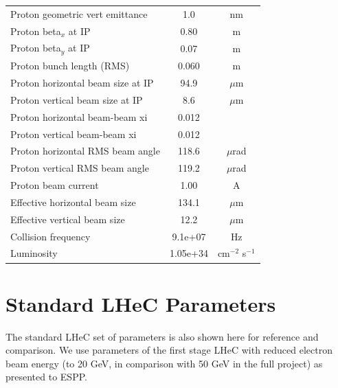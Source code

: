 \documentclass{article}
\begin{document}
\begin{longtable}{lcc}
Proton geometric vert emittance & 1.0 & nm \\
Proton beta$_x$ at IP & 0.80 & m \\
Proton beta$_y$ at IP & 0.07 & m \\
Proton bunch length (RMS) & 0.060 & m \\
Proton horizontal beam size at IP & 94.9 & $\mu$m \\
Proton vertical beam size at IP & 8.6 & $\mu$m \\
Proton horizontal beam-beam xi & 0.012 &  \\
Proton vertical beam-beam xi & 0.012 &  \\
Proton horizontal RMS beam angle & 118.6 & $\mu$rad \\
Proton vertical RMS beam angle & 119.2 & $\mu$rad \\
Proton beam current & 1.00 & A \\
Effective horizontal beam size & 134.1 & $\mu$m \\
Effective vertical beam size & 12.2 & $\mu$m \\
Collision frequency & 9.1e+07 & Hz \\
Luminosity & 1.05e+34 & cm$^{-2}$ s$^{-1}$ \\
\bottomrule
\end{longtable}

\section{Standard LHeC Parameters}

The standard LHeC set of parameters is also shown here for reference and comparison. We use parameters of the first stage LHeC with reduced electron beam energy (to 20 GeV, in comparison with 50 GeV in the full project) as presented to ESPP. 
\end{document}
